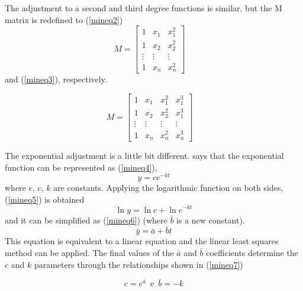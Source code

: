 \documentclass[10pt, conference, compsocconf]{IEEEtran}
\begin{document}
The adjustment to a second and third degree functions is similar, but the M matrix
is redefined to (\ref{mineq2}) 
\begin{equation}
	M = \left[\begin{array}{ccc}
               	1 & x_{1} & x_{1}^{2} \\
               	1 & x_{2}  & x_{2}^{2}\\
		\vdots & \vdots & \vdots \\
		1 & x_{n} & x_{n}^{2}
          	         \end{array}\right] \quad
	\label{mineq2}
	\end{equation}
	and (\ref{mineq3}), respectively. 

		\begin{equation}
	M = \left[\begin{array}{cccc}
               	1 & x_{1} & x_{1}^{2} & x_{1}^{3} \\
               	1 & x_{2}  & x_{2}^{2} & x_{1}^{3}\\
		\vdots & \vdots  & \vdots & \vdots\\
		1 & x_{n} &  x_{n}^{2} & x_{n}^{3}
          	         \end{array}\right] \quad
	\label{mineq3}
	\end{equation}
	
The exponential adjustment is a little bit different. \cite{calculo} says
that the exponential function can be represented as (\ref{mineq4}),
\begin{equation}
	\label{mineq4}
		y = ce^{-kt}
	\end{equation}
where $e$, $c$, $k$ are constants. Applying the logarithmic function on
both sides, (\ref{mineq5}) is obtained \begin{equation}
	\label{mineq5}
		\ln{y} = \ln{c}  + \ln{e^{-kt}}
	\end{equation}
	and it can be simplified
as (\ref{mineq6}) (where $\bar{b}$ is a new constant). 
\begin{equation}
	\label{mineq6}
		\bar{y} = \bar{a} + \bar{b}t
	\end{equation}	
This equation
is equivalent to a linear equation and the linear least squares method can be applied.
The final values of the $\bar{a}$ and $\bar{b}$ coefficients determine
the $c$ and $k$ parameters through  the relationships shown in (\ref{mineq7})

\begin{equation}
  \label{mineq7}
	c = e^{\bar{a}}\, \, \, \mbox{e}\, \, \,\bar{b} = -k
	\end{equation} 
\end{document}
